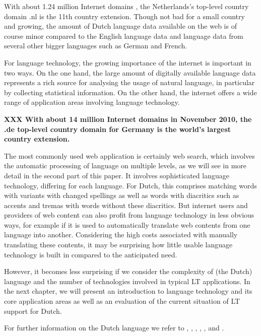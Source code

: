 \documentclass{scrartcl}
\newcommand{\boxtext}[1]{
  \begin{center}
    {\textbf{#1}}
  \end{center}
}
\begin{document}
\begin{Parallel}[c]{70mm}{70mm}
{    With about 1.24 million Internet domains \cite{Webstats}, the Netherlands's top-level country domain .nl is the 11th country extension. Though not bad for a small country and growing, the amount of Dutch language data available on the web is of course minor compared to the English language data and language data from several other bigger languages such as German and French.

    For language technology, the growing importance of the internet is important in two ways. On the one hand, the large amount of digitally available language data represents a rich source for analysing the usage of natural language, in particular by collecting statistical information. On the other hand, the internet offers a wide range of application areas involving language technology.

\boxtext{XXX With about 14 million Internet domains in November 2010, the .de top-level country domain for Germany is the world’s largest country extension.}

    The most commonly used web application is certainly web search, which involves the automatic processing of language on multiple levels, as we will see in more detail in the second part of this paper. It involves sophisticated language technology, differing for each language. For Dutch, this comprises matching words with variants with changed spellings as well as words with diacritics such as accents and tremas with words without these diacritics. But internet users and providers of web content can also profit from language technology in less obvious ways, for example if it is used to automatically translate web contents from one language into another. Considering the high costs associated with manually translating these contents, it may be surprising how little usable language technology is built in compared to the anticipated need.

    However, it becomes less surprising if we consider the complexity of (the Dutch) language and the number of technologies involved in typical LT applications. In the next chapter, we will present an introduction to language technology and its core application areas as well as an evaluation of the current situation of LT support for Dutch.

    For further information on the Dutch language we refer to \cite{e-ans}, \cite{TUFenW}, \cite{NedWiki:Fries}, \cite{NedWiki:Nederlands}, \cite{NedWiki:Nedersaksisch},  \cite{Ethn-Dutch} and \cite{Ethn-LN}.
  }

  \ParallelPar



\end{Parallel}
\end{document}
